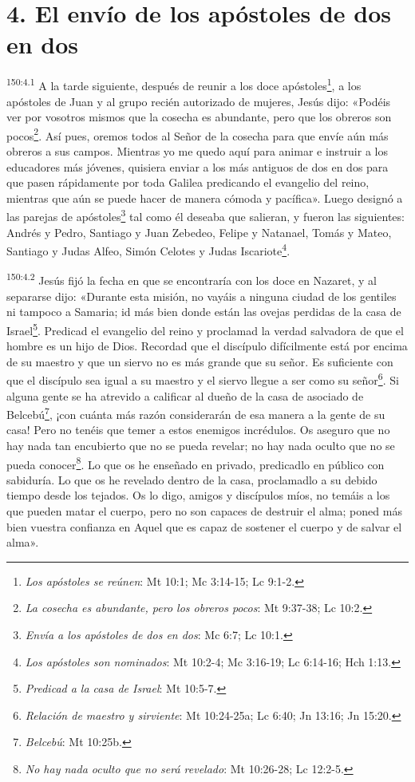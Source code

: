 \section*{4. El envío de los apóstoles de dos en dos}
\par 
\textsuperscript{150:4.1} A la tarde siguiente, después de reunir a los doce apóstoles\footnote{\textit{Los apóstoles se reúnen}: Mt 10:1; Mc 3:14-15; Lc 9:1-2.}, a los apóstoles de Juan y al grupo recién autorizado de mujeres, Jesús dijo: «Podéis ver por vosotros mismos que la cosecha es abundante, pero que los obreros son pocos\footnote{\textit{La cosecha es abundante, pero los obreros pocos}: Mt 9:37-38; Lc 10:2.}. Así pues, oremos todos al Señor de la cosecha para que envíe aún más obreros a sus campos. Mientras yo me quedo aquí para animar e instruir a los educadores más jóvenes, quisiera enviar a los más antiguos de dos en dos para que pasen rápidamente por toda Galilea predicando el evangelio del reino, mientras que aún se puede hacer de manera cómoda y pacífica». Luego designó a las parejas de apóstoles\footnote{\textit{Envía a los apóstoles de dos en dos}: Mc 6:7; Lc 10:1.} tal como él deseaba que salieran, y fueron las siguientes: Andrés y Pedro, Santiago y Juan Zebedeo, Felipe y Natanael, Tomás y Mateo, Santiago y Judas Alfeo, Simón Celotes y Judas Iscariote\footnote{\textit{Los apóstoles son nominados}: Mt 10:2-4; Mc 3:16-19; Lc 6:14-16; Hch 1:13.}.

\par 
\textsuperscript{150:4.2} Jesús fijó la fecha en que se encontraría con los doce en Nazaret, y al separarse dijo: «Durante esta misión, no vayáis a ninguna ciudad de los gentiles ni tampoco a Samaria; id más bien donde están las ovejas perdidas de la casa de Israel\footnote{\textit{Predicad a la casa de Israel}: Mt 10:5-7.}. Predicad el evangelio del reino y proclamad la verdad salvadora de que el hombre es un hijo de Dios. Recordad que el discípulo difícilmente está por encima de su maestro y que un siervo no es más grande que su señor. Es suficiente con que el discípulo sea igual a su maestro y el siervo llegue a ser como su señor\footnote{\textit{Relación de maestro y sirviente}: Mt 10:24-25a; Lc 6:40; Jn 13:16; Jn 15:20.}. Si alguna gente se ha atrevido a calificar al dueño de la casa de asociado de Belcebú\footnote{\textit{Belcebú}: Mt 10:25b.}, ¡con cuánta más razón considerarán de esa manera a la gente de su casa! Pero no tenéis que temer a estos enemigos incrédulos. Os aseguro que no hay nada tan encubierto que no se pueda revelar; no hay nada oculto que no se pueda conocer\footnote{\textit{No hay nada oculto que no será revelado}: Mt 10:26-28; Lc 12:2-5.}. Lo que os he enseñado en privado, predicadlo en público con sabiduría. Lo que os he revelado dentro de la casa, proclamadlo a su debido tiempo desde los tejados. Os lo digo, amigos y discípulos míos, no temáis a los que pueden matar el cuerpo, pero no son capaces de destruir el alma; poned más bien vuestra confianza en Aquel que es capaz de sostener el cuerpo y de salvar el alma».

